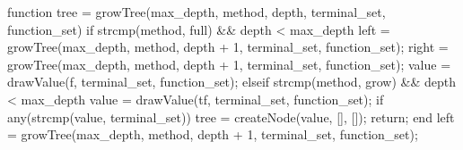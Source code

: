 \documentclass[
  letterpaper,
  DIV=11,
  numbers=noendperiod]{scrartcl}
\newenvironment{Shaded}{\begin{snugshade}}{\end{snugshade}}
\newcommand{\FloatTok}[1]{\textcolor[rgb]{0.68,0.00,0.00}{#1}}
\newcommand{\KeywordTok}[1]{\textcolor[rgb]{0.00,0.23,0.31}{#1}}
\newcommand{\NormalTok}[1]{\textcolor[rgb]{0.00,0.23,0.31}{#1}}
\newcommand{\OperatorTok}[1]{\textcolor[rgb]{0.37,0.37,0.37}{#1}}
\newcommand{\SpecialStringTok}[1]{\textcolor[rgb]{0.13,0.47,0.30}{#1}}
\newcommand{\VariableTok}[1]{\textcolor[rgb]{0.07,0.07,0.07}{#1}}
\begin{document}
\begin{Shaded}
\begin{Highlighting}[]
\KeywordTok{function} \VariableTok{tree} \OperatorTok{=} \VariableTok{growTree}\NormalTok{(}\VariableTok{max\_depth}\OperatorTok{,} \VariableTok{method}\OperatorTok{,} \VariableTok{depth}\OperatorTok{,} \VariableTok{terminal\_set}\OperatorTok{,} \VariableTok{function\_set}\NormalTok{)}
    \KeywordTok{if} \VariableTok{strcmp}\NormalTok{(}\VariableTok{method}\OperatorTok{,} \SpecialStringTok{\textquotesingle{}full\textquotesingle{}}\NormalTok{) }\OperatorTok{\&\&} \VariableTok{depth} \OperatorTok{\textless{}} \VariableTok{max\_depth}
        \VariableTok{left} \OperatorTok{=} \VariableTok{growTree}\NormalTok{(}\VariableTok{max\_depth}\OperatorTok{,} \VariableTok{method}\OperatorTok{,} \VariableTok{depth} \OperatorTok{+} \FloatTok{1}\OperatorTok{,} \VariableTok{terminal\_set}\OperatorTok{,} \VariableTok{function\_set}\NormalTok{)}\OperatorTok{;}
        \VariableTok{right} \OperatorTok{=} \VariableTok{growTree}\NormalTok{(}\VariableTok{max\_depth}\OperatorTok{,} \VariableTok{method}\OperatorTok{,} \VariableTok{depth} \OperatorTok{+} \FloatTok{1}\OperatorTok{,} \VariableTok{terminal\_set}\OperatorTok{,} \VariableTok{function\_set}\NormalTok{)}\OperatorTok{;}
        \VariableTok{value} \OperatorTok{=} \VariableTok{drawValue}\NormalTok{(}\SpecialStringTok{\textquotesingle{}f\textquotesingle{}}\OperatorTok{,} \VariableTok{terminal\_set}\OperatorTok{,} \VariableTok{function\_set}\NormalTok{)}\OperatorTok{;}
    \KeywordTok{elseif} \VariableTok{strcmp}\NormalTok{(}\VariableTok{method}\OperatorTok{,} \SpecialStringTok{\textquotesingle{}grow\textquotesingle{}}\NormalTok{) }\OperatorTok{\&\&} \VariableTok{depth} \OperatorTok{\textless{}} \VariableTok{max\_depth}
        \VariableTok{value} \OperatorTok{=} \VariableTok{drawValue}\NormalTok{(}\SpecialStringTok{\textquotesingle{}tf\textquotesingle{}}\OperatorTok{,} \VariableTok{terminal\_set}\OperatorTok{,} \VariableTok{function\_set}\NormalTok{)}\OperatorTok{;}
        \KeywordTok{if} \VariableTok{any}\NormalTok{(}\VariableTok{strcmp}\NormalTok{(}\VariableTok{value}\OperatorTok{,} \VariableTok{terminal\_set}\NormalTok{))}
            \VariableTok{tree} \OperatorTok{=} \VariableTok{createNode}\NormalTok{(}\VariableTok{value}\OperatorTok{,}\NormalTok{ []}\OperatorTok{,}\NormalTok{ [])}\OperatorTok{;}
            \KeywordTok{return}\OperatorTok{;}
        \KeywordTok{end}
        \VariableTok{left} \OperatorTok{=} \VariableTok{growTree}\NormalTok{(}\VariableTok{max\_depth}\OperatorTok{,} \VariableTok{method}\OperatorTok{,} \VariableTok{depth} \OperatorTok{+} \FloatTok{1}\OperatorTok{,} \VariableTok{terminal\_set}\OperatorTok{,} \VariableTok{function\_set}\NormalTok{)}\OperatorTok{;}

\end{Highlighting}
\end{Shaded}
\end{document}
